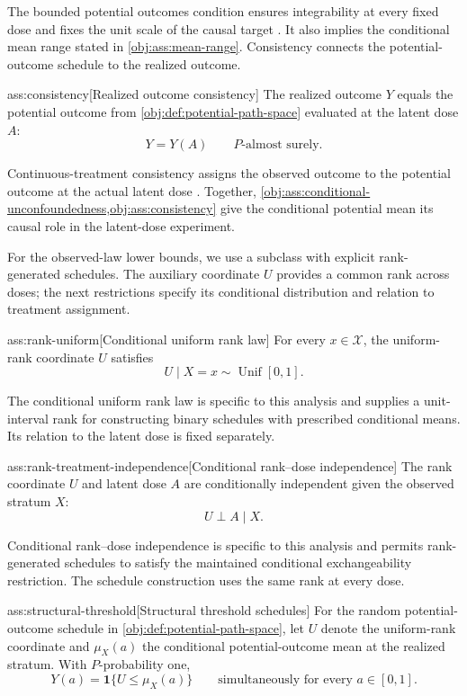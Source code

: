 The bounded potential outcomes condition ensures integrability at every fixed dose and fixes the unit scale of the causal target \citep{HuangZhang2023}. It also implies the conditional mean range stated in \cref{obj:ass:mean-range}. Consistency connects the potential-outcome schedule to the realized outcome.

\begin{assumptionv}{ass:consistency}[Realized outcome consistency]
The realized outcome \(Y\) equals the potential outcome from \cref{obj:def:potential-path-space} evaluated at the latent dose \(A\):
\[
Y=Y(A)\qquad P\text{-almost surely}.
\]
\end{assumptionv}

Continuous-treatment consistency assigns the observed outcome to the potential outcome at the actual latent dose \citep{HuangZhang2023}. Together, \cref{obj:ass:conditional-unconfoundedness,obj:ass:consistency} give the conditional potential mean its causal role in the latent-dose experiment.

For the observed-law lower bounds, we use a subclass with explicit rank-generated schedules. The auxiliary coordinate \(U\) provides a common rank across doses; the next restrictions specify its conditional distribution and relation to treatment assignment.

\begin{assumptionv}{ass:rank-uniform}[Conditional uniform rank law]
For every \(x\in\mathcal X\), the uniform-rank coordinate \(U\) satisfies
\[
U\mid X=x\sim\operatorname{Unif}[0,1].
\]
\end{assumptionv}

The conditional uniform rank law is specific to this analysis and supplies a unit-interval rank for constructing binary schedules with prescribed conditional means. Its relation to the latent dose is fixed separately.

\begin{assumptionv}{ass:rank-treatment-independence}[Conditional rank–dose independence]
The rank coordinate \(U\) and latent dose \(A\) are conditionally independent given the observed stratum \(X\):
\[
U\perp A\mid X.
\]
\end{assumptionv}

Conditional rank–dose independence is specific to this analysis and permits rank-generated schedules to satisfy the maintained conditional exchangeability restriction. The schedule construction uses the same rank at every dose.

\begin{assumptionv}{ass:structural-threshold}[Structural threshold schedules]
For the random potential-outcome schedule in \cref{obj:def:potential-path-space}, let \(U\) denote the uniform-rank coordinate and \(\mu_X(a)\) the conditional potential-outcome mean at the realized stratum. With \(P\)-probability one,
\[
Y(a)=\mathbf 1\{U\le \mu_X(a)\}
\qquad
\text{simultaneously for every }a\in[0,1].
\]
\end{assumptionv}

